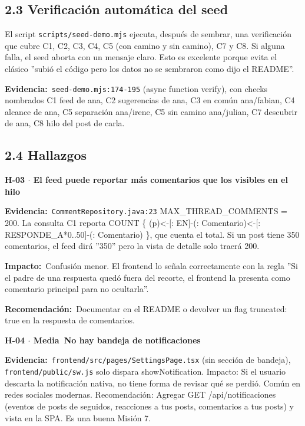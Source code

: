 \documentclass[10pt,a4paper]{article}
\newcommand{\code}[1]{\nolinkurl{#1}}
\newcommand{\badgeMedia}{\colorbox{yellow!35}{\textcolor{brown!90!black}{\textbf{\footnotesize Media}}}}
\begin{document}
\subsection{2.3 Verificación automática del seed}
El script \code{scripts/seed-demo.mjs} ejecuta, después de sembrar, una verificación que cubre C1, C2, C3, C4, C5 (con camino y sin camino), C7 y C8. Si alguna falla, el seed aborta con un mensaje claro. Esto es excelente porque evita el clásico ''subió el código pero los datos no se sembraron como dijo el README''.\par\vspace{0.4em}
\noindent\textbf{Evidencia:}\ \code{seed-demo.mjs:174-195} (async function verify), con checks nombrados C1 feed de ana, C2 sugerencias de ana, C3 en común ana/fabian, C4 alcance de ana, C5 separación ana/irene, C5 sin camino ana/julian, C7 descubrir de ana, C8 hilo del post de carla.\par\vspace{0.4em}
\subsection{2.4 Hallazgos}
\vspace{0.8em}\noindent\textbf{\large H-03 $\cdot$ El feed puede reportar más comentarios que los visibles en el hilo}\par\vspace{0.3em}
\noindent\textbf{Evidencia:}\ \code{CommentRepository.java:23} MAX\_THREAD\_COMMENTS = 200. La consulta C1 reporta COUNT \{ (p)<-[: EN]-(: Comentario)<-[: RESPONDE\_A*0..50]-(: Comentario) \}, que cuenta el total. Si un post tiene 350 comentarios, el feed dirá ''350'' pero la vista de detalle solo traerá 200.\par\vspace{0.4em}
\noindent\textbf{Impacto:}\ Confusión menor. El frontend lo señala correctamente con la regla ''Si el padre de una respuesta quedó fuera del recorte, el frontend la presenta como comentario principal para no ocultarla''.\par\vspace{0.4em}
\noindent\textbf{Recomendación:}\ Documentar en el README o devolver un flag truncated: true en la respuesta de comentarios.\par\vspace{0.4em}
\vspace{0.8em}\noindent\textbf{\large H-04 $\cdot$ \badgeMedia\  No hay bandeja de notificaciones}\par\vspace{0.3em}
\noindent\textbf{Evidencia:}\ \code{frontend/src/pages/SettingsPage.tsx} (sin sección de bandeja), \code{frontend/public/sw.js} solo dispara showNotification.  Impacto: Si el usuario descarta la notificación nativa, no tiene forma de revisar qué se perdió. Común en redes sociales modernas.  Recomendación: Agregar GET /api/notificaciones (eventos de posts de seguidos, reacciones a tus posts, comentarios a tus posts) y vista en la SPA. Es una buena Misión 7.\par\vspace{0.4em}
\end{document}
